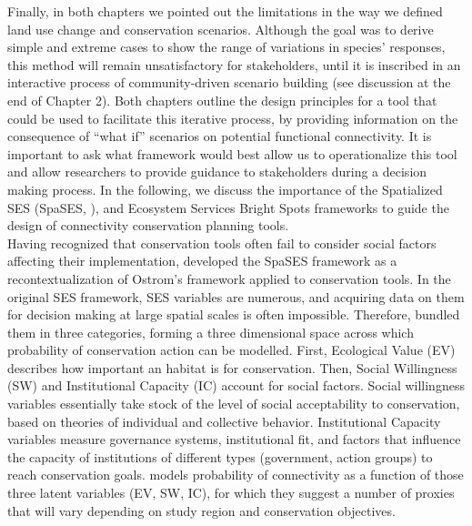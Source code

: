 \documentclass[12pt,Bold,TexShade]{thesis/mcgilletdclass}
\begin{document}
{Finally, in both chapters we pointed out the limitations in the way we defined land use change and conservation scenarios. Although the goal was to derive simple and extreme cases to show the range of variations in species’ responses, this method will remain unsatisfactory for stakeholders, until it is inscribed in an interactive process of community-driven scenario building (see discussion at the  end of Chapter 2). Both chapters outline the design principles for a tool that could be used to facilitate this iterative process, by providing information on the consequence of “what if” scenarios on potential functional connectivity. It is important to ask what framework would best allow us to operationalize this tool and allow researchers to provide guidance to stakeholders during a decision making process. In the following, we discuss the importance of the Spatialized SES (SpaSES, \cite{williamson_spatially_2018}), and Ecosystem Services Bright Spots \citep{frei_bright_2018} frameworks to guide the design of connectivity conservation planning tools. \\

Having recognized that conservation tools often fail to consider social factors affecting their implementation, \cite{williamson_spatially_2018} developed the SpaSES framework as a recontextualization of Ostrom’s framework applied to conservation tools. In the original SES framework, SES variables are numerous, and acquiring data on them for decision making at large spatial scales is often impossible. Therefore, \citeauthor{williamson_spatially_2018} bundled them in three categories, forming a three dimensional space across which probability of conservation action can be modelled. First, Ecological Value (EV) describes how important an habitat is for conservation. Then, Social Willingness (SW) and Institutional Capacity (IC) account for social factors. Social willingness variables essentially take stock of the level of social acceptability to conservation, based on theories of individual and collective behavior. Institutional Capacity variables measure governance systems, institutional fit, and factors that influence the capacity of institutions of different types (government, action groups) to reach conservation goals. \citeauthor{williamson_spatially_2018} models probability of connectivity as a function of those three latent variables (EV, SW, IC), for which they suggest a number of proxies that will vary depending on study region and conservation objectives. \\

}
\end{document}
